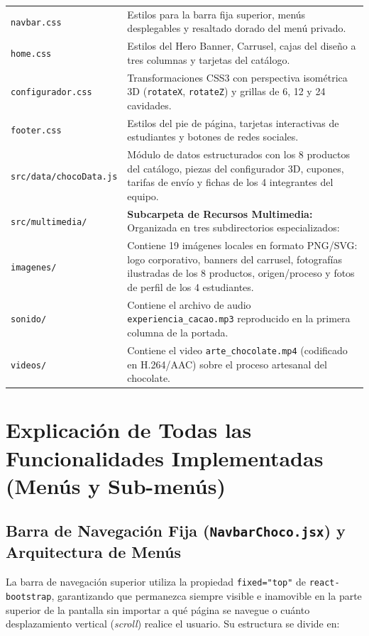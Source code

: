 \documentclass[12pt,letterpaper]{article}
\begin{document}
\begin{longtable}{p{} p{}}
\quad \texttt{navbar.css} & Estilos para la barra fija superior, menús desplegables y resaltado dorado del menú privado. \\
\quad \texttt{home.css} & Estilos del Hero Banner, Carrusel, cajas del diseño a tres columnas y tarjetas del catálogo. \\
\quad \texttt{configurador.css} & Transformaciones CSS3 con perspectiva isométrica 3D (\texttt{rotateX}, \texttt{rotateZ}) y grillas de 6, 12 y 24 cavidades. \\
\quad \texttt{footer.css} & Estilos del pie de página, tarjetas interactivas de estudiantes y botones de redes sociales. \\
\midrule
\texttt{src/data/chocoData.js} & Módulo de datos estructurados con los 8 productos del catálogo, piezas del configurador 3D, cupones, tarifas de envío y fichas de los 4 integrantes del equipo. \\
\midrule
\texttt{src/multimedia/} & \textbf{Subcarpeta de Recursos Multimedia:} Organizada en tres subdirectorios especializados: \\
\quad \texttt{imagenes/} & Contiene 19 imágenes locales en formato PNG/SVG: logo corporativo, banners del carrusel, fotografías ilustradas de los 8 productos, origen/proceso y fotos de perfil de los 4 estudiantes. \\
\quad \texttt{sonido/} & Contiene el archivo de audio \texttt{experiencia\_cacao.mp3} reproducido en la primera columna de la portada. \\
\quad \texttt{videos/} & Contiene el video \texttt{arte\_chocolate.mp4} (codificado en H.264/AAC) sobre el proceso artesanal del chocolate. \\
\bottomrule
\end{longtable}

\newpage

\section{Explicación de Todas las Funcionalidades Implementadas (Menús y Sub-menús)}

\subsection{Barra de Navegación Fija (\texttt{NavbarChoco.jsx}) y Arquitectura de Menús}
La barra de navegación superior utiliza la propiedad \texttt{fixed="top"} de \texttt{react-bootstrap}, garantizando que permanezca siempre visible e inamovible en la parte superior de la pantalla sin importar a qué página se navegue o cuánto desplazamiento vertical (\textit{scroll}) realice el usuario. Su estructura se divide en:
\end{document}
